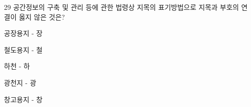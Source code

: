 \begin{question}{29}
공간정보의 구축 및 관리 등에 관한 법령상 지목의 표기방법으로 지목과 부호의 연결이 옳지 않은 것은?
\begin{choices}
  \item 공장용지 - 장
  \item 철도용지 - 철
  \item 하천 - 하
  \item 광천지 - 광
  \item 창고용지 - 창
\end{choices}
\end{question}
